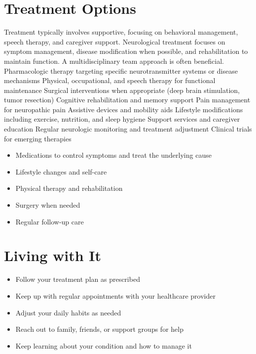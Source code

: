 \section{Treatment Options}
Treatment typically involves supportive, focusing on behavioral management, speech therapy, and caregiver support. Neurological treatment focuses on symptom management, disease modification when possible, and rehabilitation to maintain function. A multidisciplinary team approach is often beneficial. Pharmacologic therapy targeting specific neurotransmitter systems or disease mechanisms Physical, occupational, and speech therapy for functional maintenance Surgical interventions when appropriate (deep brain stimulation, tumor resection) Cognitive rehabilitation and memory support Pain management for neuropathic pain Assistive devices and mobility aids Lifestyle modifications including exercise, nutrition, and sleep hygiene Support services and caregiver education Regular neurologic monitoring and treatment adjustment Clinical trials for emerging therapies

\begin{itemize}[noitemsep]
  \item Medications to control symptoms and treat the underlying cause
  \item Lifestyle changes and self-care
  \item Physical therapy and rehabilitation
  \item Surgery when needed
  \item Regular follow-up care
\end{itemize}

\section{Living with It}

\begin{itemize}[noitemsep]
  \item Follow your treatment plan as prescribed
  \item Keep up with regular appointments with your healthcare provider
  \item Adjust your daily habits as needed
  \item Reach out to family, friends, or support groups for help
  \item Keep learning about your condition and how to manage it
\end{itemize}

